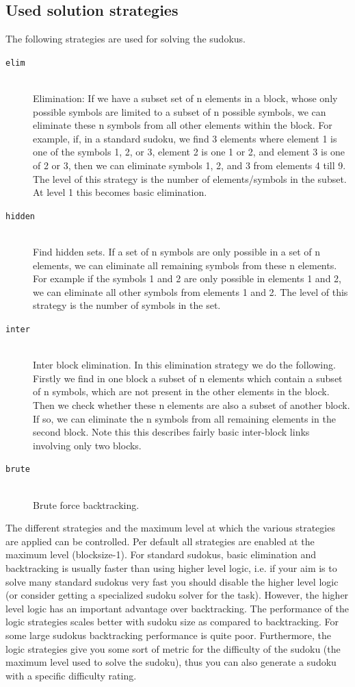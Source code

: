 \documentclass[12pt]{article}
\begin{document}
\subsection{\label{strategies}Used solution strategies}
The following strategies are used for solving the sudokus.
\begin{description}
\item[\texttt{elim}] \hfill \\
Elimination: If we have a subset set of n elements in a block, whose 
only possible symbols are limited to a subset of n possible symbols, we 
can eliminate these n symbols from all other elements within the block.
For example, if, in a standard sudoku, we find 3 elements where element 
1 is one of the symbols 1, 2, or 3, element 2 is one 1 or 2, and 
element 3 is one of 2 or 3, then we can eliminate symbols 1, 2, and 3 
from elements 4 till 9. The level of this strategy is the number of 
elements/symbols in the subset. At level 1 this becomes basic 
elimination.

\item[\texttt{hidden}] \hfill \\
Find hidden sets. If a set of n symbols are only possible in a set of n 
elements, we can eliminate all remaining symbols from these n elements.
For example if the symbols 1 and 2 are only possible in elements 1 and 
2, we can eliminate all other symbols from elements 1 and 2. The level 
of this strategy is the number of symbols in the set.

\item[\texttt{inter}] \hfill \\
Inter block elimination. In this elimination strategy we do the 
following. Firstly we find in one block a subset of n elements which 
contain a subset of n symbols, which are not present in the other 
elements in the block. Then we check whether these n elements are also 
a subset of another block. If so, we can eliminate the n symbols from 
all remaining elements in the second block. Note this this describes 
fairly basic inter-block links involving only two blocks.

\item[\texttt{brute}] \hfill \\
Brute force backtracking.
\end{description}

The different strategies and the maximum level at which the various strategies are applied can be controlled. Per default all strategies are enabled at the maximum level (blocksize-1). For standard sudokus, basic elimination and backtracking is usually faster than using higher level logic, i.e. if your aim is to solve many standard sudokus very fast you should disable the higher level logic (or consider getting a specialized sudoku solver for the task). However, the higher level logic has an important advantage over backtracking. The performance of the logic strategies scales better with sudoku size as compared to backtracking. For some large sudokus backtracking performance is quite poor. Furthermore, the logic strategies give you some sort of metric for the difficulty of the sudoku (the maximum level used to solve the sudoku), thus you can also generate a sudoku with a specific difficulty rating.
\end{document}
